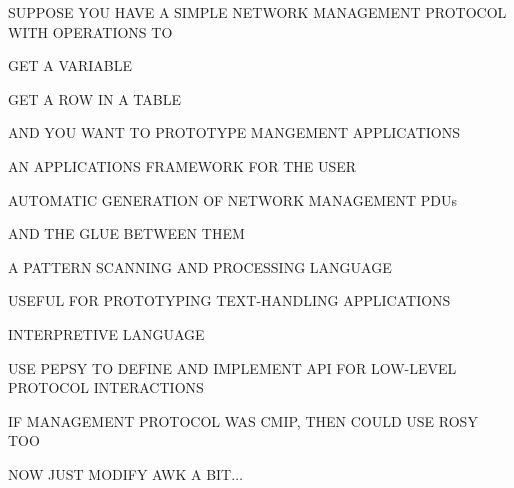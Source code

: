 \begin{bwslide}

\begin{nrtc}
\item	SUPPOSE YOU HAVE A SIMPLE NETWORK MANAGEMENT PROTOCOL WITH OPERATIONS
	TO
    \begin{nrtc}
    \item	GET A VARIABLE

    \item	GET A ROW IN A TABLE
    \end{nrtc}

\item	AND YOU WANT TO PROTOTYPE MANGEMENT APPLICATIONS
\end{nrtc}
\end{bwslide}


\begin{bwslide}

\begin{nrtc}
\item	AN APPLICATIONS FRAMEWORK FOR THE USER

\item	AUTOMATIC GENERATION OF NETWORK MANAGEMENT PDUs
    \begin{nrtc}
    \item	AND THE GLUE BETWEEN THEM    
    \end{nrtc}
\end{nrtc}
\end{bwslide}


\begin{bwslide}

\begin{nrtc}
\item	A PATTERN SCANNING AND PROCESSING LANGUAGE

\item	USEFUL FOR PROTOTYPING TEXT-HANDLING APPLICATIONS

\item	INTERPRETIVE LANGUAGE
\end{nrtc}
\end{bwslide}


\begin{bwslide}

\begin{nrtc}
\item	USE PEPSY TO DEFINE AND IMPLEMENT API FOR LOW-LEVEL PROTOCOL
	INTERACTIONS
    \begin{nrtc}
    \item	IF MANAGEMENT PROTOCOL WAS CMIP, THEN COULD USE ROSY TOO
    \end{nrtc}

\item	NOW JUST MODIFY AWK A BIT$\ldots$
\end{nrtc}
\end{bwslide}


